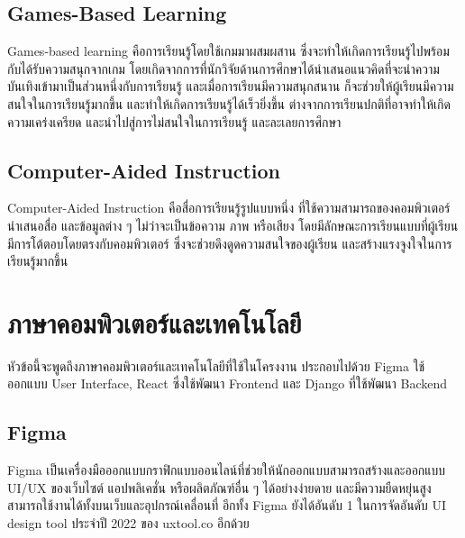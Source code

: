 \documentclass[12pt,oneside,openright,a4paper]{cpe-thai-project}
\begin{document}
\subsection{Games-Based Learning}

\hspace{1cm}
Games-based learning \cite{GBL} คือการเรียนรู้โดยใช้เกมมาผสมผสาน ซึ่งจะทำให้เกิดการเรียนรู้ไปพร้อมกับได้รับความสนุกจากเกม
โดยเกิดจากการที่นักวิจัยด้านการศึกษาได้นำเสนอแนวคิดที่จะนำความบันเทิงเข้ามาเป็นส่วนหนึ่งกับการเรียนรู้ และเมื่อการเรียนมีความสนุกสนาน
ก็จะช่วยให้ผู้เรียนมีความสนใจในการเรียนรู้มากขึ้น และทำให้เกิดการเรียนรู้ได้เร็วยิ่งขึ้น ต่างจากการเรียนปกติที่อาจทำให้เกิดความเคร่งเครียด
และนำไปสู่การไม่สนใจในการเรียนรู้ และละเลยการศึกษา

\subsection{Computer-Aided Instruction}

\hspace{1cm}
Computer-Aided Instruction \cite{CAI1,CAI2} คือสื่อการเรียนรู้รูปแบบหนึ่ง ที่ใช้ความสามารถของคอมพิวเตอร์นำเสนอสื่อ และข้อมูลต่าง ๆ
ไม่ว่าจะเป็นข้อความ ภาพ หรือเสียง โดยมีลักษณะการเรียนแบบที่ผู้เรียนมีการโต้ตอบโดยตรงกับคอมพิวเตอร์
ซึ่งจะช่วยดึงดูดความสนใจของผู้เรียน และสร้างแรงจูงใจในการเรียนรู้มากขึ้น


\pagebreak
\section{ภาษาคอมพิวเตอร์และเทคโนโลยี}

\hspace{1cm}
หัวข้อนี้จะพูดถึงภาษาคอมพิวเตอร์และเทคโนโลยีที่ใช้ในโครงงาน ประกอบไปด้วย Figma ใช้ออกแบบ User Interface,
React 
ซึ่งใช้พัฒนา Frontend และ Django ที่ใช้พัฒนา Backend 

\subsection{Figma}

\hspace{1cm}
Figma \cite{Figma} เป็นเครื่องมือออกแบบกราฟิกแบบออนไลน์ที่ช่วยให้นักออกแบบสามารถสร้างและออกแบบ UI/UX ของเว็บไซต์
แอปพลิเคชั่น หรือผลิตภัณฑ์อื่น ๆ ได้อย่างง่ายดาย และมีความยืดหยุ่นสูง สามารถใช้งานได้ทั้งบนเว็บและอุปกรณ์เคลื่อนที่
อีกทั้ง Figma ยังได้อันดับ 1 ในการจัดอันดับ UI design tool ประจำปี 2022 ของ uxtool.co อีกด้วย
\end{document}
